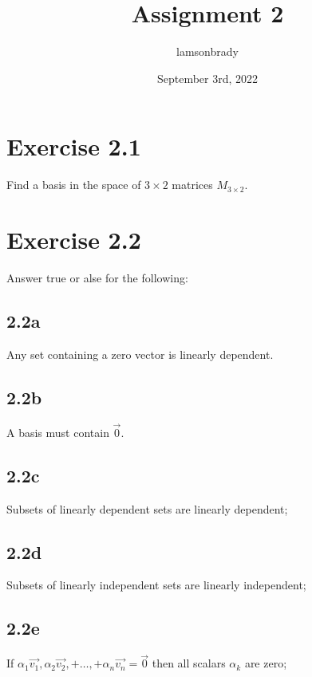 \documentclass{article}
\title{Assignment 2}
\author{lamsonbrady }
\date{September 3rd, 2022}
\begin{document}
\section*{Exercise 2.1} 
Find a basis in the space of $3 \times 2$ matrices $M_{3 \times 2}$.

\section*{Exercise 2.2}
Answer true or alse for the following:

\subsection*{2.2a} Any set containing a zero vector is linearly dependent.

\subsection*{2.2b} A basis must contain $\vec{0}$.

\subsection*{2.2c} Subsets of linearly dependent sets are linearly dependent;

\subsection*{2.2d} Subsets of linearly independent sets are linearly independent;

\subsection*{2.2e} If $\alpha_1\vec{v_1}, \alpha_2\vec{v_2}, + \dots, + \alpha_n\vec{v_n} = \vec{0}$ then all scalars $\alpha_k$ are zero;
\end{document}

